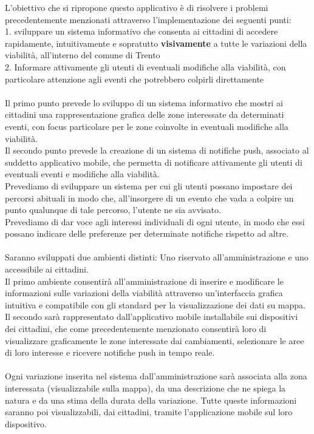 \documentclass{article}
\begin{document}
L'obiettivo che si ripropone questo applicativo è di risolvere i problemi precedentemente menzionati attraverso l'implementazione dei seguenti punti:\\
1. sviluppare un sistema informativo che consenta ai cittadini di accedere rapidamente, intuitivamente e sopratutto \textbf{visivamente} a tutte le variazioni della viabilità, all'interno del comune di Trento\\
\label{Accesso alle notizie}
2. Informare attivamente gli utenti di eventuali modifiche alla viabilità, con particolare attenzione agli eventi che potrebbero colpirli direttamente\\ %
\label{Informare i cittadini}
\\
Il primo punto prevede lo sviluppo di un sistema informativo che mostri ai cittadini una rappresentazione grafica delle zone interessate da determinati eventi, con focus particolare per le zone coinvolte in eventuali modifiche alla viabilità. \\
\label{Visualizzazione degli eventi}
Il secondo punto prevede la creazione di un sistema di notifiche push, associato al suddetto applicativo mobile, che permetta di notificare attivamente gli utenti di eventuali eventi e modifiche alla viabilità.\\
\label{Notifiche push}
Prevediamo di sviluppare un sistema per cui gli utenti possano impostare dei percorsi abituali in modo che, all'insorgere di un evento che vada a colpire un punto qualunque di tale percorso, l'utente ne sia avvisato. \\
\label{Percorsi abituali}
Prevediamo di dar voce agli interessi individuali di ogni utente, in modo che essi possano indicare delle preferenze per determinate notifiche rispetto ad altre. %
\\
\\
Saranno sviluppati due ambienti distinti: Uno riservato all'amministrazione e uno accessibile ai cittadini.\\
Il primo ambiente consentirà all'amministrazione di inserire e modificare le informazioni sulle variazioni della viabilità attraverso un'interfaccia grafica intuitiva e compatibile con gli standard per la visualizzazione dei dati su mappa.\\
\label{Gestione degli eventi}
Il secondo sarà rappresentato dall'applicativo mobile installabile sui dispositivi dei cittadini, che come precedentemente menzionato consentirà loro di visualizzare graficamente le zone interessate dai cambiamenti, selezionare le aree di loro interesse e ricevere notifiche push in tempo reale.\\
\\
Ogni variazione inserita nel sistema dall'amministrazione sarà associata alla zona interessata (visualizzabile sulla mappa), da una descrizione che ne spiega la natura e da una stima della durata della variazione. Tutte queste informazioni saranno poi visualizzabili, dai cittadini, tramite l'applicazione mobile sul loro dispositivo. 
\clearpage
\end{document}
